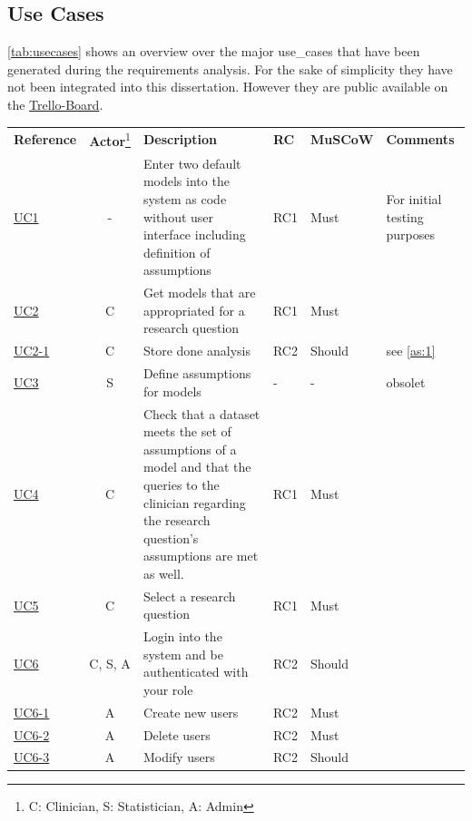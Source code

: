 \subsection{Use Cases}

\autoref{tab:usecases} shows an overview over the major \glspl{use_case} that have been generated during the requirements analysis. For the sake of simplicity they have not been integrated into this dissertation. However they are public available on the \href{https://trello.com/b/ywCkicpc}{Trello-Board}.

\begin{landscape}
	\begin{longtable}{ l c p{8cm} l l p{3cm} }
		\textbf{Reference}                         & \textbf{\gls{Actor}}\footnote{C: Clinician, S: Statistician, A: Admin} &\textbf{Description} &  \textbf{RC} & \textbf{MuSCoW} &  \textbf{Comments}\\
		\href{https://trello.com/c/KEOokZp9}{UC1}   & 	- & 	Enter two default models into the system as code without user interface including definition of assumptions & RC1 & Must &  For initial testing purposes  \\
		\href{https://trello.com/c/ebVrFdA5}{UC2}   & 	C & 	Get models that are appropriated for a research question & RC1	& Must &	   \\
		\href{https://trello.com/c/ORRBjISQ}{UC2-1} & 	C & 	Store done analysis & RC2 & Should &  see \autoref{as:1} \\
		\href{https://trello.com/c/qKLAoWRj}{UC3} 	&  	S & 	Define assumptions for models & - & - & obsolet \\
		\href{https://trello.com/c/7NINsfz8}{UC4}   & 	C & 	Check that a dataset meets the set of assumptions of a model and that the queries to the clinician regarding the research question's  assumptions are met as well. & RC1 & Must   &   \\
		\href{https://trello.com/c/22JGne3r}{UC5}   & 	C & 	Select a research question & RC1 & Must &   \\
		\href{https://trello.com/c/CVGBVWID}{UC6}   &   C, S, A & 	Login into the system and be authenticated with your role & RC2 & Should &	 \\
		\href{https://trello.com/c/pId27kJM}{UC6-1} &   A & 	Create new users & RC2 & Must &	 \\
		\href{https://trello.com/c/pQ98qgSL}{UC6-2} &  	A & 	Delete users & RC2 & Must	 &   \\
		\href{https://trello.com/c/mvxBeNSR}{UC6-3} &  	A & 	Modify users & RC2 & Should &   \\

\end{longtable}
\end{landscape}
